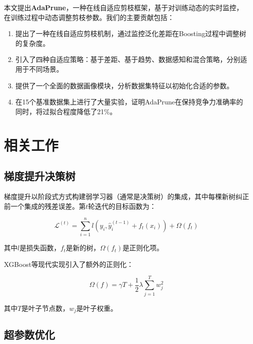 \documentclass[12pt,a4paper]{article}
\begin{document}
本文提出\textbf{AdaPrune}，一种在线自适应剪枝框架，基于对训练动态的实时监控，在训练过程中动态调整剪枝参数。我们的主要贡献包括：

\begin{enumerate}[leftmargin=2em]
    \item 提出了一种在线自适应剪枝机制，通过监控泛化差距在Boosting过程中调整树的复杂度。
    \item 引入了四种自适应策略：基于差距、基于趋势、数据感知和混合策略，分别适用于不同场景。
    \item 提供了一个全面的数据画像模块，分析数据集特征以初始化合适的参数。
    \item 在15个基准数据集上进行了大量实验，证明AdaPrune在保持竞争力准确率的同时，将过拟合程度降低了21\%。
\end{enumerate}

\section{相关工作}

\subsection{梯度提升决策树}

梯度提升\cite{friedman2001greedy}以阶段式方式构建弱学习器（通常是决策树）的集成，其中每棵新树纠正前一个集成的残差误差。第$t$轮迭代的目标函数为：

\begin{equation}
\mathcal{L}^{(t)} = \sum_{i=1}^{n} l(y_i, \hat{y}_i^{(t-1)} + f_t(x_i)) + \Omega(f_t)
\end{equation}

其中$l$是损失函数，$f_t$是新的树，$\Omega(f_t)$是正则化项。

XGBoost\cite{chen2016xgboost}等现代实现引入了额外的正则化：

\begin{equation}
\Omega(f) = \gamma T + \frac{1}{2}\lambda \sum_{j=1}^{T} w_j^2
\end{equation}

其中$T$是叶子节点数，$w_j$是叶子权重。

\subsection{超参数优化}
\end{document}
